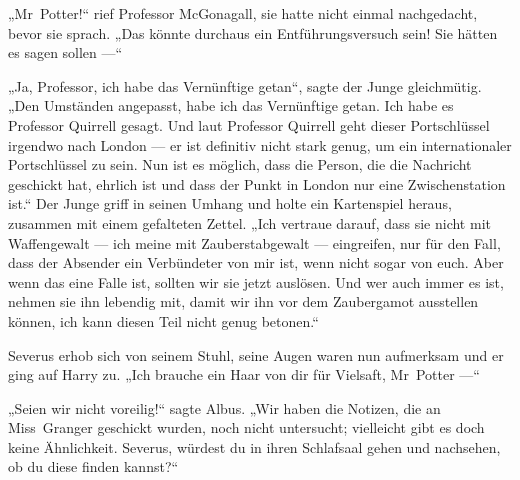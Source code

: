 „Mr~Potter!“ rief Professor McGonagall, sie hatte nicht einmal nachgedacht, bevor sie sprach.
„Das könnte durchaus ein Entführungsversuch sein! Sie hätten es sagen sollen —“

„Ja, Professor, ich habe das Vernünftige getan“, sagte der Junge gleichmütig.
„Den Umständen angepasst, habe ich das Vernünftige getan. Ich habe es Professor Quirrell gesagt. Und laut Professor Quirrell geht dieser Portschlüssel irgendwo nach London — er ist definitiv nicht stark genug, um ein internationaler Portschlüssel zu sein. Nun ist es möglich, dass die Person, die die Nachricht geschickt hat, ehrlich ist und dass der Punkt in London nur eine Zwischenstation ist.“ Der Junge griff in seinen Umhang und holte ein Kartenspiel heraus, zusammen mit einem gefalteten Zettel.
„Ich vertraue darauf, dass sie nicht mit Waffengewalt — ich meine mit Zauberstabgewalt — eingreifen, nur für den Fall, dass der Absender ein Verbündeter von mir ist, wenn nicht sogar von euch. Aber wenn das eine Falle ist, sollten wir sie jetzt auslösen. Und wer auch immer es ist, nehmen sie ihn lebendig mit, damit wir ihn vor dem Zaubergamot ausstellen können, ich kann diesen Teil nicht genug betonen.“

Severus erhob sich von seinem Stuhl, seine Augen waren nun aufmerksam und er ging auf Harry zu.
„Ich brauche ein Haar von dir für Vielsaft, Mr~Potter —“

„Seien wir nicht voreilig!“ sagte Albus.
„Wir haben die Notizen, die an Miss~Granger geschickt wurden, noch nicht untersucht; vielleicht gibt es doch keine Ähnlichkeit. Severus, würdest du in ihren Schlafsaal gehen und nachsehen, ob du diese finden kannst?“

